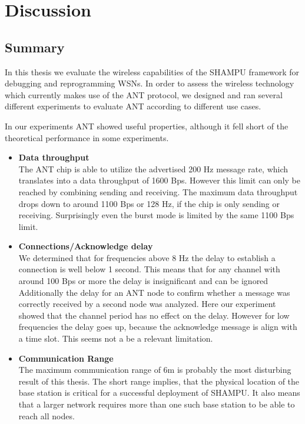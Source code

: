 \chapter{Discussion}
\section{Summary}

In this thesis we evaluate the wireless capabilities of the SHAMPU framework for debugging and reprogramming WSNs. In order to assess the wireless technology which currently makes use of the ANT protocol, we designed and ran several different experiments to evaluate ANT according to different use cases.

In our experiments ANT showed useful properties, although it fell short of the theoretical performance in some experiments.

\begin{itemize}
	\item{\textbf{Data throughput}} \hfill \\ 
	The ANT chip is able to utilize the advertised 200 Hz message rate, which translates into a data throughput of 1600 Bps. However this limit can only be reached by combining sending and receiving. The maximum data throughput drops down to around 1100 Bps or 128 Hz, if the chip is only sending or receiving. Surprisingly even the burst mode is limited by the same 1100 Bps limit.
	
	\item{\textbf{Connections/Acknowledge delay}} \hfill \\ 
	We determined that for frequencies above 8 Hz the delay to establish a connection is well below 1 second. This means that for any channel with around 100 Bps or more the delay is insignificant and can be ignored
	Additionally the delay for an ANT node to confirm whether a message was correctly received by a second node was analyzed. Here our experiment showed that the channel period has no effect on the delay. However for low frequencies the delay goes up, because the acknowledge message is align with a time slot. This seems not a be a relevant limitation.
	
	\item{\textbf{Communication Range}} \hfill \\ The maximum communication range of 6m is probably the most disturbing result of this thesis. The short range implies, that the physical location of the base station is critical for a successful deployment of SHAMPU. It also means that a larger network requires more than one such base station to be able to reach all nodes. 
\end{itemize}

